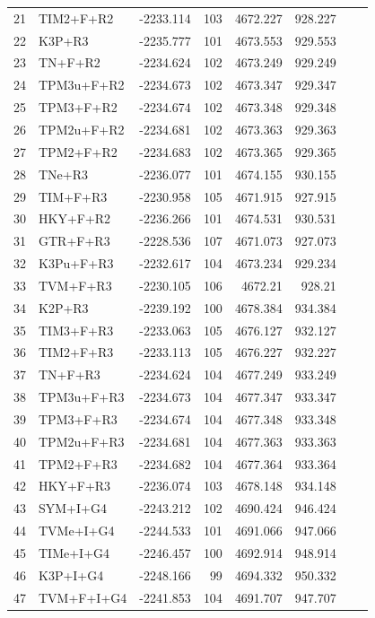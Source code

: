 \documentclass[fleqn,letterpaper]{article}
\begin{document}
\begin{longtable}{clrrrrrr}
	21 & TIM2+F+R2 & -2233.114 & 103 & 4672.227 & 928.227 \\ 
	22 & K3P+R3 & -2235.777 & 101 & 4673.553 & 929.553 \\ 
	23 & TN+F+R2 & -2234.624 & 102 & 4673.249 & 929.249 \\ 
	24 & TPM3u+F+R2 & -2234.673 & 102 & 4673.347 & 929.347 \\ 
	25 & TPM3+F+R2 & -2234.674 & 102 & 4673.348 & 929.348 \\ 
	26 & TPM2u+F+R2 & -2234.681 & 102 & 4673.363 & 929.363 \\ 
	27 & TPM2+F+R2 & -2234.683 & 102 & 4673.365 & 929.365 \\ 
	28 & TNe+R3 & -2236.077 & 101 & 4674.155 & 930.155 \\ 
	29 & TIM+F+R3 & -2230.958 & 105 & 4671.915 & 927.915 \\ 
	30 & HKY+F+R2 & -2236.266 & 101 & 4674.531 & 930.531 \\ 
	31 & GTR+F+R3 & -2228.536 & 107 & 4671.073 & 927.073 \\ 
	32 & K3Pu+F+R3 & -2232.617 & 104 & 4673.234 & 929.234 \\ 
	33 & TVM+F+R3 & -2230.105 & 106 & 4672.21 & 928.21 \\ 
	34 & K2P+R3 & -2239.192 & 100 & 4678.384 & 934.384 \\ 
	35 & TIM3+F+R3 & -2233.063 & 105 & 4676.127 & 932.127 \\ 
	36 & TIM2+F+R3 & -2233.113 & 105 & 4676.227 & 932.227 \\ 
	37 & TN+F+R3 & -2234.624 & 104 & 4677.249 & 933.249 \\ 
	38 & TPM3u+F+R3 & -2234.673 & 104 & 4677.347 & 933.347 \\ 
	39 & TPM3+F+R3 & -2234.674 & 104 & 4677.348 & 933.348 \\ 
	40 & TPM2u+F+R3 & -2234.681 & 104 & 4677.363 & 933.363 \\ 
	41 & TPM2+F+R3 & -2234.682 & 104 & 4677.364 & 933.364 \\ 
	42 & HKY+F+R3 & -2236.074 & 103 & 4678.148 & 934.148 \\ 
	43 & SYM+I+G4 & -2243.212 & 102 & 4690.424 & 946.424 \\ 
	44 & TVMe+I+G4 & -2244.533 & 101 & 4691.066 & 947.066 \\ 
	45 & TIMe+I+G4 & -2246.457 & 100 & 4692.914 & 948.914 \\ 
	46 & K3P+I+G4 & -2248.166 & 99 & 4694.332 & 950.332 \\ 
	47 & TVM+F+I+G4 & -2241.853 & 104 & 4691.707 & 947.707 \\ 

\end{longtable}
\end{document}
